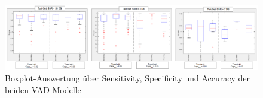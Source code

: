 \begin{appendices}
\begin{landscape}
 \begin{figure}[h]
	\centering
	\includegraphics[width=1.2\textwidth]{bilder/all_boxplots.png}
	\caption{Boxplot-Auswertung über Sensitivity, Specificity und Accuracy der beiden VAD-Modelle}
	\label{img:boxplots}
\end{figure}

\end{landscape}

\end{appendices}
